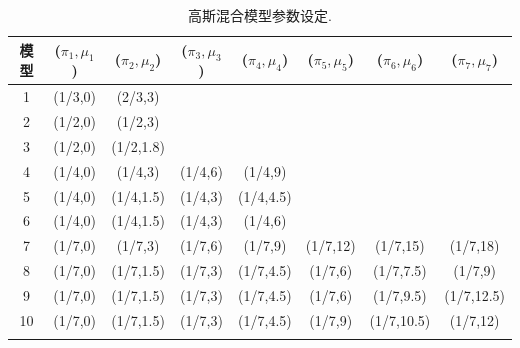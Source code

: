 \documentclass[a4paper,12pt,openany,oneside,utf-8]{ctexbook}
\newcommand{\wuhao}{\fontsize{10.5pt}{\baselineskip}\selectfont}
\begin{document}
\begin{table}[h!] %
\wuhao
\centering
{}   %
\caption{高斯混合模型参数设定.}
\label{tab:Parameter values for the normal mixture models}
\medskip
\begin{tabular}{c ccccccc}
\Xhline{1.0pt}
模型 & ($\pi_1,\mu_1$) & ($\pi_2,\mu_2$) & ($\pi_3,\mu_3$) & ($\pi_4,\mu_4$) & ($\pi_5,\mu_5$) & ($\pi_6,\mu_6$) & ($\pi_7,\mu_7$)\\
\hline
1  & (1/3,0) & (2/3,3)   &         &           &          &            &           \\
2  & (1/2,0) & (1/2,3)   &         &           &          &            &           \\
3  & (1/2,0) & (1/2,1.8) &         &           &          &            &           \\
4  & (1/4,0) & (1/4,3)   & (1/4,6) & (1/4,9)   &          &            &           \\
5  & (1/4,0) & (1/4,1.5) & (1/4,3) & (1/4,4.5) &          &            &           \\
6  & (1/4,0) & (1/4,1.5) & (1/4,3) & (1/4,6)   &          &            &           \\
7  & (1/7,0) & (1/7,3)   & (1/7,6) & (1/7,9)   & (1/7,12) & (1/7,15)   & (1/7,18)  \\
8  & (1/7,0) & (1/7,1.5) & (1/7,3) & (1/7,4.5) & (1/7,6)  & (1/7,7.5)  & (1/7,9)   \\
9  & (1/7,0) & (1/7,1.5) & (1/7,3) & (1/7,4.5) & (1/7,6)  & (1/7,9.5)  & (1/7,12.5)\\
10 & (1/7,0) & (1/7,1.5) & (1/7,3) & (1/7,4.5) & (1/7,9)  & (1/7,10.5) & (1/7,12)  \\
\Xhline{1.0pt}
\end{tabular}
\end{table}
\end{document}
